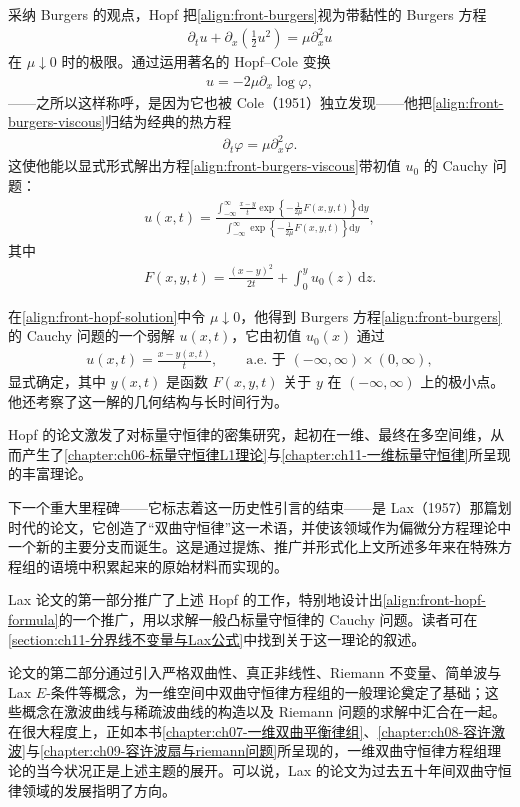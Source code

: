\documentclass[../../main.tex]{subfiles}
\begin{document}
采纳 Burgers 的观点，Hopf 把\eqref{align:front-burgers}视为带黏性的 Burgers 方程
\begin{align}
\partial_t u+\partial_x\left(\frac{1}{2}u^{2}\right)=\mu\partial_x^{2}u\label{align:front-burgers-viscous}
\end{align}
在 $\mu\downarrow0$ 时的极限。通过运用著名的 Hopf--Cole 变换
\begin{align}
u=-2\mu\partial_x\log\varphi,\label{align:front-hopf-cole}
\end{align}
——之所以这样称呼，是因为它也被 Cole（1951）独立发现——他把\eqref{align:front-burgers-viscous}归结为经典的热方程
\begin{align}
\partial_t\varphi=\mu\partial_x^{2}\varphi.\label{align:front-heat}
\end{align}
这使他能以显式形式解出方程\eqref{align:front-burgers-viscous}带初值 $u_0$ 的 Cauchy 问题：
\begin{align}
u(x,t)=\frac{\displaystyle\int_{-\infty}^{\infty}\frac{x-y}{t}\exp\left\{-\frac{1}{2\mu}F(x,y,t)\right\}\mathrm{d}y}
{\displaystyle\int_{-\infty}^{\infty}\exp\left\{-\frac{1}{2\mu}F(x,y,t)\right\}\mathrm{d}y},\label{align:front-hopf-solution}
\end{align}
其中
\begin{align}
F(x,y,t)=\frac{(x-y)^{2}}{2t}+\int_{0}^{y}u_0(z)\,\mathrm{d}z.\label{align:front-hopf-f}
\end{align}

在\eqref{align:front-hopf-solution}中令 $\mu\downarrow0$，他得到 Burgers 方程\eqref{align:front-burgers}的 Cauchy 问题的一个弱解 $u(x,t)$，它由初值 $u_0(x)$ 通过
\begin{align}
u(x,t)=\frac{x-y(x,t)}{t},\qquad\text{a.e. 于 }(-\infty,\infty)\times(0,\infty),\label{align:front-hopf-formula}
\end{align}
显式确定，其中 $y(x,t)$ 是函数 $F(x,y,t)$ 关于 $y$ 在 $(-\infty,\infty)$ 上的极小点。他还考察了这一解的几何结构与长时间行为。

Hopf 的论文激发了对标量守恒律的密集研究，起初在一维、最终在多空间维，从而产生了\cref{chapter:ch06-标量守恒律L1理论}与\cref{chapter:ch11-一维标量守恒律}所呈现的丰富理论。

下一个重大里程碑——它标志着这一历史性引言的结束——是 Lax（1957）那篇划时代的论文，它创造了“双曲守恒律”这一术语，并使该领域作为偏微分方程理论中一个新的主要分支而诞生。这是通过提炼、推广并形式化上文所述多年来在特殊方程组的语境中积累起来的原始材料而实现的。

Lax 论文的第一部分推广了上述 Hopf 的工作，特别地设计出\eqref{align:front-hopf-formula}的一个推广，用以求解一般凸标量守恒律的 Cauchy 问题。读者可在\cref{section:ch11-分界线不变量与Lax公式}中找到关于这一理论的叙述。

论文的第二部分通过引入严格双曲性、真正非线性、Riemann 不变量、简单波与 Lax $E$-条件等概念，为一维空间中双曲守恒律方程组的一般理论奠定了基础；这些概念在激波曲线与稀疏波曲线的构造以及 Riemann 问题的求解中汇合在一起。在很大程度上，正如本书\cref{chapter:ch07-一维双曲平衡律组}、\cref{chapter:ch08-容许激波}与\cref{chapter:ch09-容许波扇与riemann问题}所呈现的，一维双曲守恒律方程组理论的当今状况正是上述主题的展开。可以说，Lax 的论文为过去五十年间双曲守恒律领域的发展指明了方向。
\end{document}

